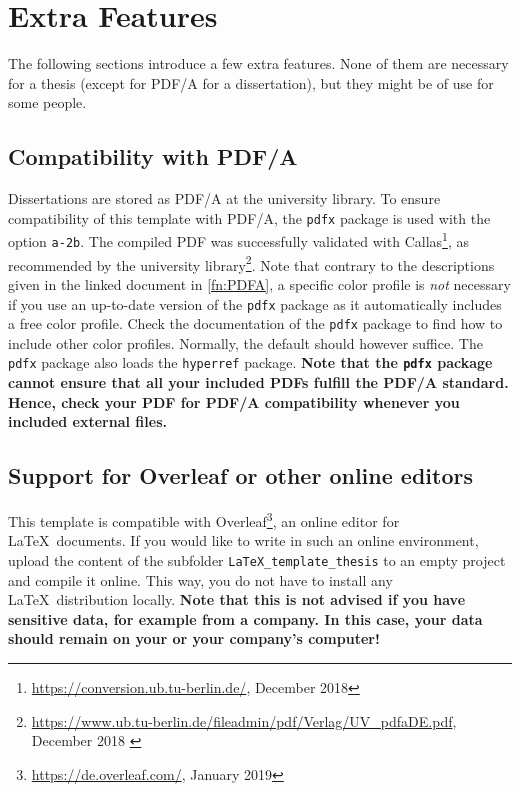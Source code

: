 \section{Extra Features}
The following sections introduce a few extra features. None of them are necessary for a thesis (except for PDF/A for a dissertation), but they might be of use for some people.
\subsection{Compatibility with PDF/A}
Dissertations are stored as PDF/A at the university library. To ensure compatibility of this template with PDF/A, the \verb+pdfx+ package is used with the option \verb+a-2b+. The compiled PDF was successfully validated with Callas\footnote{\url{https://conversion.ub.tu-berlin.de/}, December 2018}, as recommended by the university library\footnote{\url{https://www.ub.tu-berlin.de/fileadmin/pdf/Verlag/UV_pdfaDE.pdf}, December 2018 \label{fn:PDFA}}.  Note that contrary to the descriptions given in the linked document in \autoref{fn:PDFA}, a specific color profile is \emph{not} necessary if you use an up-to-date version of the \verb+pdfx+ package as it automatically includes a free color profile. Check the documentation of the \verb+pdfx+ package to find how to include other color profiles. Normally, the default should however suffice. The \verb+pdfx+ package also loads the \verb+hyperref+ package. \textbf{Note that the \texttt{pdfx} package cannot ensure that all your included PDFs fulfill the PDF/A standard. Hence, check your PDF for PDF/A compatibility whenever you included external files.}
\subsection{Support for Overleaf or other online editors}\label{subsec:overleaf}
This template is compatible with Overleaf\footnote{\url{https://de.overleaf.com/}, January 2019}, an online editor for \LaTeX\ documents. If you would like to write in such an online environment, upload the content of the subfolder \verb+LaTeX_template_thesis+ to an empty project and compile it online. This way, you do not have to install any \LaTeX\ distribution locally. \textbf{Note that this is not advised if you have sensitive data, for example from a company. In this case, your data should remain on your or your company's computer!}

